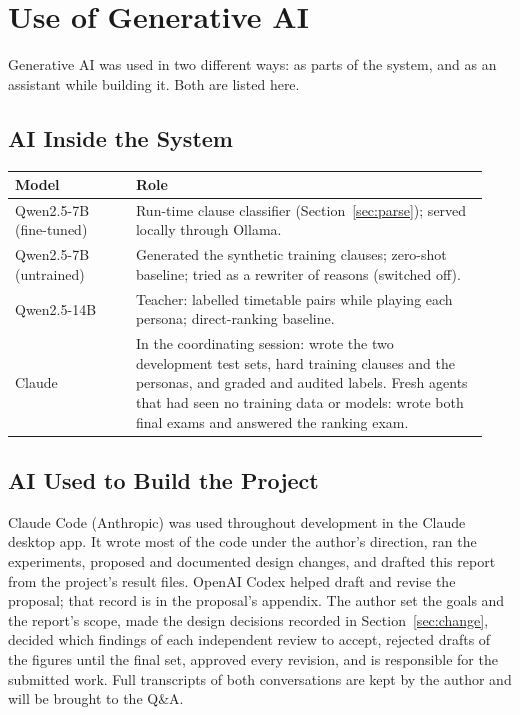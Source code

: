 \section{Use of Generative AI}\label{app:ai}

Generative AI was used in two different ways: as parts of the system, and as an assistant while building it. Both are listed here.

\subsection{AI Inside the System}

\begin{center}\small
\begin{tabular}{@{}>{\raggedright\arraybackslash}p{0.24\linewidth}>{\raggedright\arraybackslash}p{0.7\linewidth}@{}}
	\toprule
	Model & Role \\
	\midrule
	Qwen2.5-7B (fine-tuned) & Run-time clause classifier (Section~\ref{sec:parse}); served locally through Ollama. \\
	Qwen2.5-7B (untrained) & Generated the synthetic training clauses; zero-shot baseline; tried as a rewriter of reasons (switched off). \\
	Qwen2.5-14B & Teacher: labelled timetable pairs while playing each persona; direct-ranking baseline. \\
	Claude & In the coordinating session: wrote the two development test sets, \sHardAll{} hard training clauses and the \sPersonas{} personas, and graded and audited labels. Fresh agents that had seen no training data or models: wrote both final exams and answered the ranking exam. \\
	\bottomrule
\end{tabular}
\end{center}

\subsection{AI Used to Build the Project}

Claude Code (Anthropic) was used throughout development in the Claude desktop app. It wrote most of the code under the author's direction, ran the experiments, proposed and documented design changes, and drafted this report from the project's result files. OpenAI Codex helped draft and revise the proposal; that record is in the proposal's appendix. The author set the goals and the report's scope, made the design decisions recorded in Section~\ref{sec:change}, decided which findings of each independent review to accept, rejected drafts of the figures until the final set, approved every revision, and is responsible for the submitted work. Full transcripts of both conversations are kept by the author and will be brought to the Q\&A.

